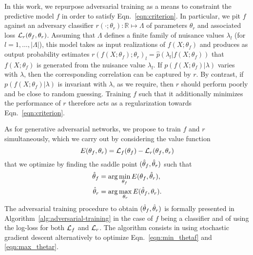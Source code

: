 \documentclass{article}
\theoremstyle{plain}
\begin{document}
In this work, we repurpose adversarial training as a means to constraint the
predictive model $f$ in order to satisfy Eqn.~\ref{eqn:criterion}. In
particular, we pit $f$ against an adversary classifier $r(\cdot ;
\theta_r) : \mathbb{R} \mapsto \Lambda$ of parameters $\theta_r$ and
associated loss ${\cal L}_r(\theta_f, \theta_r)$.
Assuming that $\Lambda$ defines a finite family of nuisance values $\lambda_l$ (for $l=1, \dots, |\Lambda|$),
this model takes as input realizations of $f(X; \theta_f)$
and produces as output probability estimates $r(f(X; \theta_f); \theta_r)_l = \hat{p}(\lambda_l| f(X; \theta_f)) $
that $f(X; \theta_f)$ is generated from the nuisance value $\lambda_l$. If $p(f(X; \theta_f)|\lambda)$ varies with $\lambda$,
then the corresponding correlation can be captured by $r$. By contrast, if
$p(f(X; \theta_f)|\lambda)$ is invariant with $\lambda$, as we require, then $r$
should perform poorly and be close to random guessing. Training $f$ such that it additionally minimizes the performance of $r$
therefore acts as a regularization towards Eqn.~\ref{eqn:criterion}.

As for generative adversarial networks, we propose to
train $f$ and $r$ simultaneously, which we carry out by considering
the value function
\begin{equation}
    E(\theta_f, \theta_r) = {\cal L}_f(\theta_f) - {\cal L}_r(\theta_f, \theta_r)
\end{equation}
that we optimize by finding the saddle point $(\smash{\hat\theta_f}, \smash{\hat\theta_r})$ such that
\begin{align}
    \smash{\hat\theta_f} &= \arg \min_{\theta_f} E(\theta_f, \smash{\hat\theta_r}), \label{eqn:min_thetaf} \\
    \smash{\hat\theta_r} &= \arg \max_{\theta_r} E(\smash{\hat\theta_f}, \theta_r) \label{eqn:max_thetar}.
\end{align}
The adversarial training procedure to obtain $(\smash{\hat\theta_f},
\smash{\hat\theta_r})$ is formally presented in
Algorithm~\ref{alg:adversarial-training} in the case of $f$ being a classifier
and of using the log-loss for both ${\cal L}_f$ and ${\cal L}_r$. The algorithm
consists in using stochastic gradient descent alternatively to optimize
Eqn.~\ref{eqn:min_thetaf} and \ref{eqn:max_thetar}.
\end{document}
